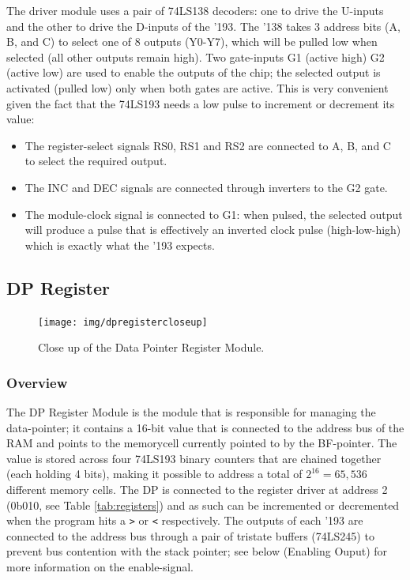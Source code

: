 The driver module uses a pair of 74LS138 decoders: one to drive the U-inputs and the other to drive the D-inputs of the '193. The '138 takes 3 address bits (A, B, and C) to select one of 8 outputs (Y0-Y7), which will be pulled low when selected (all other outputs remain high). Two gate-inputs G1 (active high) G2 (active low) are used to enable the outputs of the chip; the selected output is activated (pulled low) only when both gates are active. This is very convenient given the fact that the 74LS193 needs a low pulse to increment or decrement its value:
\begin{itemize}
\item The register-select signals RS0, RS1 and RS2 are connected to A, B, and C to select the required output.
\item The INC and DEC signals are connected through inverters to the G2 gate.
\item The module-clock signal is connected to G1: when pulsed, the selected output will produce a pulse that is effectively an inverted clock pulse (high-low-high) which is exactly what the '193 expects. 
\end{itemize}


\newpage\subsection{DP Register} \label{sec:implementation:dp}
\begin{figure}[H]
  \centering
  \texttt{[image: img/dpregistercloseup]}
  \caption{Close up of the Data Pointer Register Module.}
  \label{fig:dpregcloseup}
\end{figure}

\subsubsection{Overview}
The DP Register Module is the module that is responsible for managing the data-pointer; it contains a 16-bit value that is connected to the address bus of the RAM and points to the memorycell currently pointed to by the BF-pointer. The value is stored across four 74LS193 binary counters that are chained together (each holding 4 bits), making it possible to address a total of $2^{16}=65,536$ different memory cells. The DP is connected to the register driver at address 2 (0b010, see Table \ref{tab:registers}) and as such can be incremented or decremented when the program hits a \texttt{>} or \texttt{<} respectively. The outputs of each '193 are connected to the address bus through a pair of tristate buffers (74LS245) to prevent bus contention with the stack pointer; see below (Enabling Ouput) for more information on the enable-signal.

